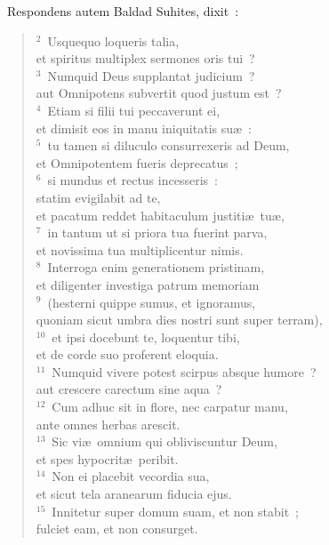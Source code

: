 ~\lettrine[lines=10,image=true,loversize=0.05,lraise=-0.03]{R}{}espondens autem Baldad Suhites, dixit~:
\begin{flushleft}\begin{verse}\vspace{6pt}${}^{2}$~Usquequo loqueris talia,\\ et spiritus multiplex sermones oris tui~?\\
${}^{3}$~Numquid Deus supplantat judicium~?\\ aut Omnipotens subvertit quod justum est~?\\
${}^{4}$~Etiam si filii tui peccaverunt ei,\\ et dimisit eos in manu iniquitatis su\ae~:\\
${}^{5}$~tu tamen si diluculo consurrexeris ad Deum,\\ et Omnipotentem fueris deprecatus~;\\
${}^{6}$~si mundus et rectus incesseris~:\\ statim evigilabit ad te,\\ et pacatum reddet habitaculum justiti\ae\ tu\ae ,\\
${}^{7}$~in tantum ut si priora tua fuerint parva,\\ et novissima tua multiplicentur nimis.\\
${}^{8}$~Interroga enim generationem pristinam,\\ et diligenter investiga patrum memoriam\\
${}^{9}$~(hesterni quippe sumus, et ignoramus,\\ quoniam sicut umbra dies nostri sunt super terram),\\
${}^{10}$~et ipsi docebunt te, loquentur tibi,\\ et de corde suo proferent eloquia.\\
${}^{11}$~Numquid vivere potest scirpus absque humore~?\\ aut crescere carectum sine aqua~?\\
${}^{12}$~Cum adhuc sit in flore, nec carpatur manu,\\ ante omnes herbas arescit.\\
${}^{13}$~Sic vi\ae\ omnium qui obliviscuntur Deum,\\ et spes hypocrit\ae\ peribit.\\
${}^{14}$~Non ei placebit vecordia sua,\\ et sicut tela aranearum fiducia ejus.\\
${}^{15}$~Innitetur super domum suam, et non stabit~;\\ fulciet eam, et non consurget.\\

\end{verse}
\end{flushleft}
